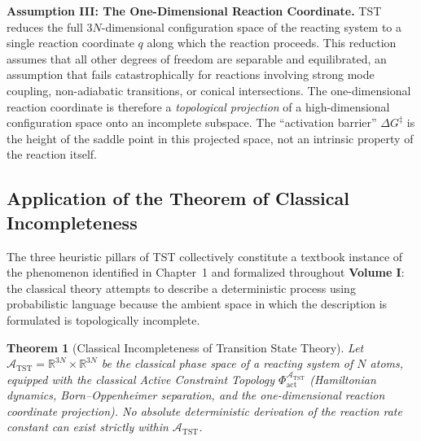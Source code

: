 \documentclass[11pt,openany]{extbook}
\theoremstyle{plain}
\newtheorem{theorem}{Theorem}[chapter]
\theoremstyle{definition}
\begin{document}
\noindent \textbf{Assumption III: The One-Dimensional Reaction Coordinate.} TST reduces the full $3N$-dimensional configuration space of the reacting system to a single reaction coordinate $q$ along which the reaction proceeds. This reduction assumes that all other degrees of freedom are separable and equilibrated, an assumption that fails catastrophically for reactions involving strong mode coupling, non-adiabatic transitions, or conical intersections. The one-dimensional reaction coordinate is therefore a \emph{topological projection} of a high-dimensional configuration space onto an incomplete subspace. The ``activation barrier'' $\Delta G^{\ddagger}$ is the height of the saddle point in this projected space, not an intrinsic property of the reaction itself.

\subsection{Application of the Theorem of Classical Incompleteness}

\noindent The three heuristic pillars of TST collectively constitute a textbook instance of the phenomenon identified in Chapter~1 and formalized throughout \textbf{Volume I}: the classical theory attempts to describe a deterministic process using probabilistic language because the ambient space in which the description is formulated is topologically incomplete.

\begin{theorem}[Classical Incompleteness of Transition State Theory]
\label{thm:tst-incompleteness}
Let $\mathcal{A}_{\mathrm{TST}} = \mathbb{R}^{3N} \times \mathbb{R}^{3N}$ be the classical phase space of a reacting system of $N$ atoms, equipped with the classical Active Constraint Topology $\Phi_{\mathrm{act}}^{\mathcal{A}_{\mathrm{TST}}}$ (Hamiltonian dynamics, Born--Oppenheimer separation, and the one-dimensional reaction coordinate projection). No absolute deterministic derivation of the reaction rate constant can exist strictly within $\mathcal{A}_{\mathrm{TST}}$.
\end{theorem}
\end{document}
